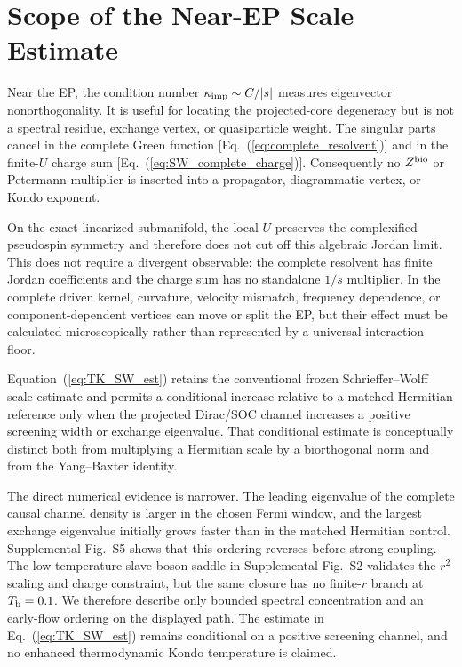 \documentclass[%
  aps,prb,reprint,amsmath,amssymb,superscriptaddress,longbibliography,floatfix
]{revtex4-2}
\newcommand{\keff}{\kappa_{\rm imp}}
\begin{document}
\section{Scope of the Near-EP Scale Estimate}
\label{sec:kondo}

Near the EP, the condition number
$\keff\sim C/|s|$ measures eigenvector nonorthogonality.  It is useful
for locating the projected-core degeneracy but is not a spectral residue,
exchange vertex, or quasiparticle weight.  The singular parts cancel in the
complete Green function [Eq.~(\ref{eq:complete_resolvent})] and in the
finite-$U$ charge sum [Eq.~(\ref{eq:SW_complete_charge})].  Consequently no
$Z^{\rm bio}$ or Petermann multiplier is inserted into a propagator,
diagrammatic vertex, or Kondo exponent.

On the exact linearized submanifold, the local \(U\) preserves the
complexified pseudospin symmetry and therefore does not cut off this
algebraic Jordan limit.  This does not require a divergent observable: the
complete resolvent has finite Jordan coefficients and the charge sum has no
standalone $1/s$ multiplier.  In the complete driven
kernel, curvature, velocity mismatch, frequency dependence, or
component-dependent vertices can move or split the EP, but their effect must
be calculated microscopically rather than represented by a universal
interaction floor.

Equation~(\ref{eq:TK_SW_est}) retains the conventional frozen
Schrieffer--Wolff scale estimate and
permits a conditional increase relative to a matched Hermitian reference
only when the projected Dirac/SOC channel increases a positive screening
width or exchange eigenvalue.  That conditional estimate is conceptually
distinct both from multiplying a Hermitian scale by a biorthogonal norm and
from the Yang--Baxter identity.

The direct numerical evidence is narrower.  The leading eigenvalue of the
complete causal channel density is larger in the chosen Fermi window, and
the largest exchange eigenvalue initially grows faster than in the matched
Hermitian control.
Supplemental Fig.~S5 shows that this ordering reverses before strong
coupling.  The low-temperature slave-boson saddle in Supplemental Fig.~S2
validates the $r^2$ scaling and charge constraint, but the same closure has no
finite-$r$ branch at $T_{\rm b}=0.1$.  We therefore describe only bounded
spectral concentration and an early-flow ordering on the displayed path.
The estimate in Eq.~(\ref{eq:TK_SW_est}) remains conditional on a positive
screening channel, and no enhanced thermodynamic Kondo temperature is
claimed.
\end{document}
